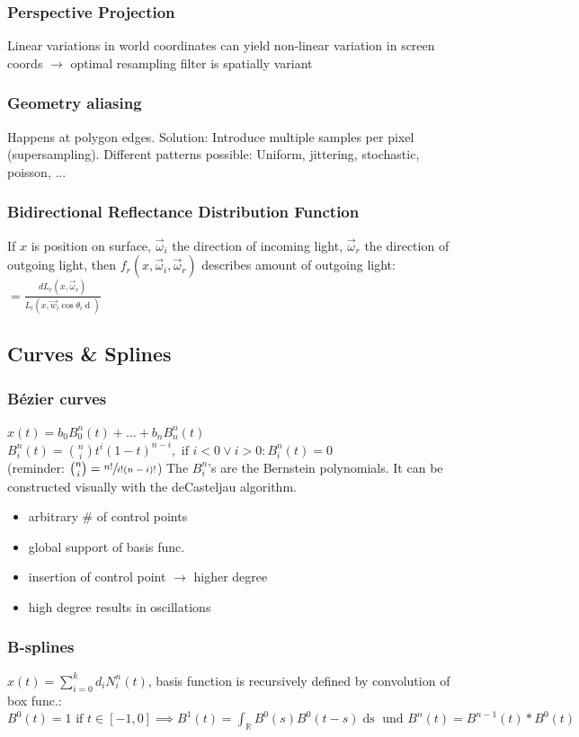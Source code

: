 \documentclass[a4paper,10pt]{article}
\newcommand*\good{\item[\textcolor{goodgreen}{\(\bm{+}\)}]}
\newcommand*\bad{\item[\textcolor{badred}{\(\bm{-}\)}]}
\begin{document}
\subsubsection{Perspective Projection} Linear variations in world coordinates can yield non-linear variation in screen coords \( \to  \) optimal resampling filter is spatially variant
\subsubsection{Geometry aliasing} Happens at polygon edges. Solution: Introduce multiple samples per pixel (supersampling). Different patterns possible: Uniform, jittering, stochastic, poisson, ...

\subsubsection{Bidirectional Reflectance Distribution Function}
If \( x \) is position on surface, \( \vec{\omega}_i \) the direction of incoming light, \( \vec{\omega}_r \) the direction of outgoing light, then \( f_r(x, \vec{\omega}_i, \vec{\omega}_r) \) describes amount of outgoing light:
\( = \frac{dL_r(x, \vec{\omega}_r)}{L_i(x, \vec{w}_i \cos \theta _i \mathop{d\vec{w}_i})} \)

\subsection{Curves \& Splines}
\subsubsection{Bézier curves}
\( x(t) = b_0 B^n_0(t) + \ldots + b_n B^n_n (t) \) \\
\( B^n_i(t) = \binom{n}{i} t^i (1-t)^{n-i}, \text{ if } i < 0 \lor i >0: B^n_i (t) = 0 \) \\
(reminder: \( \binom{n}{i} = \sfrac{n!}{i!(n-i)!} \)) The \( B^n_i \)'s are the Bernstein polynomials.
It can be constructed visually with the deCasteljau algorithm. 
\begin{itemize}
    \good arbitrary \# of control points
    \bad global support of basis func.
    \bad insertion of control point \( \to  \) higher degree
    \bad high degree results in oscillations
\end{itemize}

\subsubsection{B-splines}
\( x(t) = \sum_{i=0}^k d_i N_i^n (t) \), basis function is recursively defined by convolution of box func.: 
\( B^0(t) = 1 \text{ if } t \in [-1, 0] \implies B^1(t) = \int_\mathbb{R} B^0(s) B^0(t-s) \mathop{ds} \text{ und } B^n(t) = B^{n-1}(t) * B^0(t)\)
\end{document}
